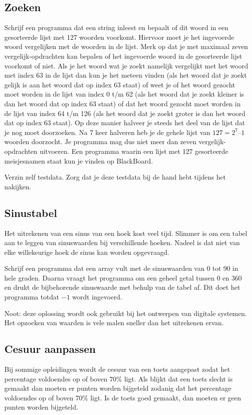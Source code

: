 \documentclass[a4paper,10pt,fleqn,twoside]{article}
\begin{document}
\subsection{Zoeken}
Schrijf een programma dat een string inleest en bepaalt of dit woord in een gesorteerde lijst met 127 woorden voorkomt. Hiervoor moet je het ingevoerde woord vergelijken met de woorden in de lijst. Merk op dat je met maximaal zeven vergelijk-opdrachten kan bepalen of het ingevoerde woord in de gesorteerde lijst voorkomt of niet. Als je het woord wat je zoekt namelijk vergelijkt met het woord met index 63 in de lijst dan kun je het meteen vinden (als het woord dat je zoekt gelijk is aan het woord dat op index 63 staat) of weet je of het woord gezocht moet worden in de lijst van index 0 t/m 62 (als het woord dat je zoekt kleiner is dan het woord dat op index 63 staat) of dat het woord gezocht moet worden in de lijst van index 64 t/m 126 (als het woord dat je zoekt groter is dan het woord dat op index 63 staat). Op deze manier halveer je steeds het deel van de lijst dat je nog moet doorzoeken. Na 7 keer halveren heb je de gehele lijst van $127 = 2^7 – 1$ woorden doorzocht. Je programma mag dus niet meer dan zeven vergelijk-opdrachten uitvoeren. Een programma waarin een lijst met 127 gesorteerde meisjesnamen staat kun je vinden op BlackBoard. 

Verzin zelf testdata. Zorg dat je deze testdata bij de hand hebt tijdens het nakijken.

\subsection{Sinustabel}
Het uitrekenen van een sinus van een hoek kost veel tijd. Slimmer is om een tabel aan te leggen van sinuswaarden bij verschillende hoeken. Nadeel is dat niet van elke willekeurige hoek de sinus kan worden opgevraagd.

Schrijf een programma dat een array vult met de sinuswaarden van 0 tot 90 in hele graden. Daarna vraagt het programma om een geheel getal tussen 0 en 360 en drukt de bijbehorende sinuswaarde met behulp van de tabel af. Dit doet het programma totdat $-1$ wordt ingevoerd.

Noot: deze oplossing wordt ook gebruikt bij het ontwerpen van digitale systemen. Het opzoeken van waarden is vele malen sneller dan het uitrekenen ervan.


\subsection{Cesuur aanpassen}
Bij sommige opleidingen wordt de cesuur van een toets aangepast zodat het percentage voldoendes op of boven 70\% ligt. Als blijkt dat een toets slecht is gemaakt dan moeten er punten worden bijgeteld zodanig dat het percentage voldoendes op of boven 70\% ligt. Is de toets goed gemaakt, dan moeten er geen punten worden bijgeteld.
\end{document}
